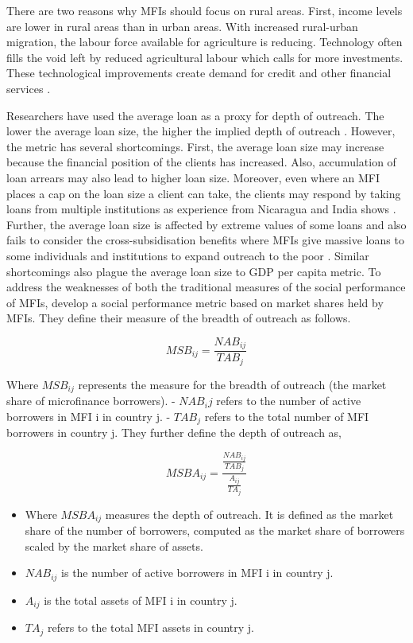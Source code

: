 \documentclass[a4paper,nobind]{templates/ociamthesis}
\begin{document}
There are two reasons why MFIs should focus on rural areas. First, income levels are lower in rural areas than in urban areas. With increased rural-urban migration, the labour force available for agriculture is reducing. Technology often fills the void left by reduced agricultural labour which calls for more investments. These technological improvements create demand for credit and other financial services \autocite{mersland2014microfinance}.

Researchers have used the average loan as a proxy for depth of outreach. The lower the average loan size, the higher the implied depth of outreach \autocite{d2017ngos}. However, the metric has several shortcomings. First, the average loan size may increase because the financial position of the clients has increased. Also, accumulation of loan arrears may also lead to higher loan size. Moreover, even where an MFI places a cap on the loan size a client can take, the clients may respond by taking loans from multiple institutions as experience from Nicaragua and India shows \autocite{bastiaensen2013after}. Further, the average loan size is affected by extreme values of some loans and also fails to consider the cross-subsidisation benefits where MFIs give massive loans to some individuals and institutions to expand outreach to the poor \autocite{chattopadhyay2017applicability,bibi2018new}. Similar shortcomings also plague the average loan size to GDP per capita metric. To address the weaknesses of both the traditional measures of the social performance of MFIs,\textcite{bibi2018new} develop a social performance metric based on market shares held by MFIs. They define their measure of the breadth of outreach as follows.

\begin{equation}
MSB_{ij} = \frac{NAB_{ij}}{TAB_j}
\end{equation}

Where \(MSB_{ij}\) represents the measure for the breadth of outreach (the market share of microfinance borrowers).
- \(NAB_ij\) refers to the number of active borrowers in MFI i in country j.
- \(TAB_j\) refers to the total number of MFI borrowers in country j.
They further define the depth of outreach as,

\begin{equation}
MSBA_{ij} = \frac{\frac{NAB_{ij}}{TAB_{j}}}{\frac{A_{ij}}{TA_j}}
\end{equation}

\begin{itemize}
\item
  Where \(MSBA_{ij}\) measures the depth of outreach. It is defined as the market share of the number of borrowers, computed as the market share of borrowers scaled by the market share of assets.
\item
  \(NAB_{ij}\) is the number of active borrowers in MFI i in country j.
\item
  \(A_{ij}\) is the total assets of MFI i in country j.
\item
  \(TA_j\) refers to the total MFI assets in country j.
\end{itemize}
\end{document}
